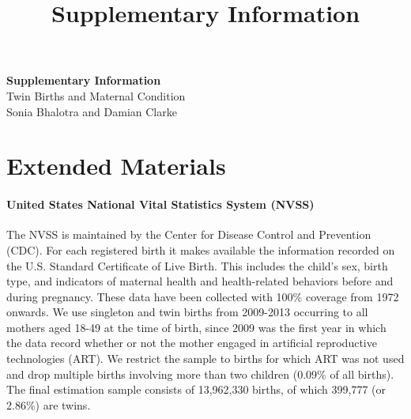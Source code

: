 \documentclass[12pt]{article}
\title{Supplementary Information}
\author{}
\date{}
\begin{document}
\baselineskip24pt

\begin{center}
  {\Large \textbf{Supplementary Information}}  \\
  Twin Births and Maternal Condition \\
  Sonia Bhalotra and Damian Clarke
\end{center}



\section{Extended Materials}
\paragraph{United States National Vital Statistics System (NVSS)}
The NVSS is maintained by the Center for Disease Control and Prevention (CDC). %
For each registered birth it makes available the information recorded on the U.S. Standard Certificate of Live Birth. This includes the child's sex, birth type, and indicators of maternal health and health-related behaviors before and during pregnancy. These data have been collected with 100\% coverage from 1972 onwards. We use singleton and twin births from 2009-2013 \cite{Martinetal2013} occurring to all mothers aged 18-49 at the time of birth, since 2009 was the first year in which the data record whether or not the mother engaged in artificial reproductive technologies (ART).%
We restrict the sample to births for which ART was not used and drop multiple births involving more than two children (0.09\% of all births). The final estimation sample consists of 13,962,330 births, of which 399,777 (or 2.86\%) are twins.
  
\end{document}
